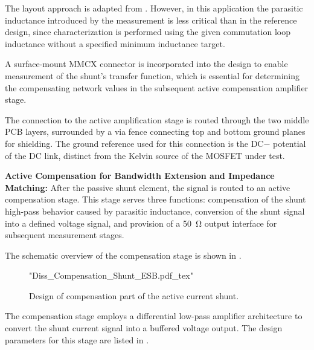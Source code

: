 The layout approach is adapted from \cite{shillaber_gigahertz_2020}. 
However, in this application the parasitic inductance introduced by the measurement is less critical than in the reference design, since characterization is performed using the given commutation loop inductance  without a specified minimum inductance target.

A surface-mount MMCX connector is incorporated into the design to enable measurement of the shunt's transfer function, which is essential for determining the compensating network values in the subsequent active compensation amplifier stage. 

The connection to the active amplification stage is routed through the two middle PCB layers, surrounded by a via fence connecting top and bottom ground planes for shielding. 
The ground reference used for this connection is the DC− potential of the DC link, distinct from the Kelvin source of the MOSFET under test. 



\textbf{Active Compensation for Bandwidth Extension and Impedance Matching:}
After the passive shunt element, the signal is routed to an active compensation stage.
This stage serves three functions: compensation of the shunt high-pass behavior caused by parasitic inductance, conversion of the shunt signal into a defined voltage signal, and provision of a \SI{50}{\ohm} output interface for subsequent measurement stages.

The schematic overview of the compensation stage is shown in .

\begin{figure}[ht]
	\centering
	{"Diss_Compensation_Shunt_ESB.pdf_tex"}
	\caption{Design of compensation part of the active current shunt.}\label{fig:ESBCompensation}
\end{figure}


The compensation stage employs a differential low-pass amplifier architecture to convert the shunt current signal into a buffered voltage output.
The design parameters for this stage are listed in .

